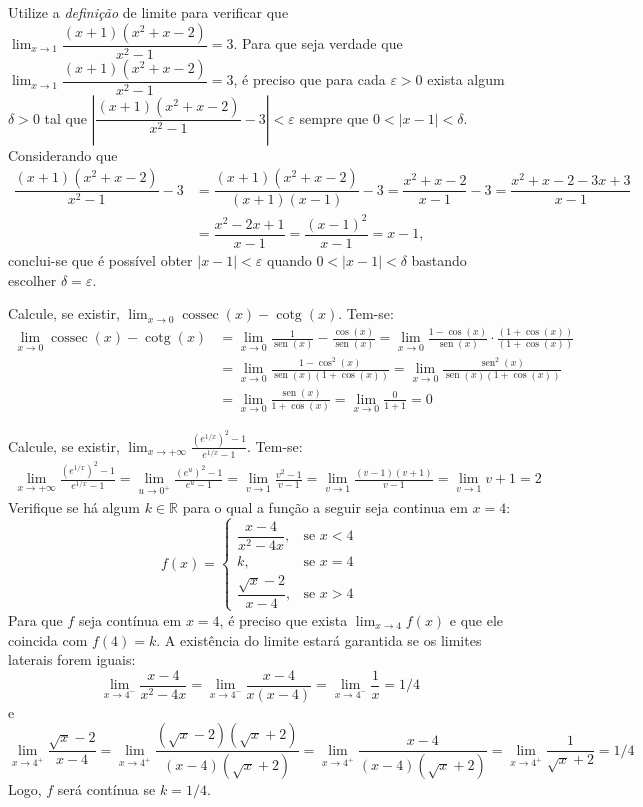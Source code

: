 \documentclass[12pt,a4paper]{article}
\newcommand*\sen{\operatorname{sen}}
\newcommand*\cotg{\operatorname{cotg}}
\newcommand*\cosec{\operatorname{cossec}}
\newcommand*\R{\mathbb{R}}
\begin{document}
\begin{ExerciseList}
\Exercise[title={2,0}] Utilize a \textit{definição} de limite para verificar que $\displaystyle \lim_{x \to 1} \dfrac{(x+1)(x^2 + x - 2)}{x^2 - 1} = 3$.
\Answer Para que seja verdade que  $\displaystyle \lim_{x \to 1} \dfrac{(x+1)(x^2 + x - 2)}{x^2 - 1} = 3$, é preciso que para cada $\varepsilon > 0$ exista algum $\delta > 0$ tal que $\left|\dfrac{(x+1)(x^2 + x - 2)}{x^2 - 1} - 3\right| < \varepsilon$ sempre que $0 < |x-1| < \delta$. Considerando que
\begin{align*}
\dfrac{(x+1)(x^2 + x - 2)}{x^2 - 1} - 3
& = \dfrac{(x+1)(x^2 + x - 2)}{(x+1)(x-1)} - 3
  = \dfrac{x^2 + x - 2}{x-1} - 3
  = \dfrac{x^2 + x - 2 - 3x + 3}{x-1} \\
& = \dfrac{x^2 -2x +1}{x-1}
  = \dfrac{(x-1)^2}{x-1}
  = x-1,
\end{align*}
conclui-se que é possível obter $|x-1| < \varepsilon$ quando $0 < |x-1| < \delta$ bastando escolher $\delta = \varepsilon$.

\Exercise[title={2,0}] Calcule, se existir, $\displaystyle\lim_{x \to 0} \cosec(x) - \cotg(x)$.
\Answer Tem-se:
\begin{align*}
\lim_{x \to 0} \cosec(x) - \cotg(x)
& = \lim_{x \to 0} \frac{1}{\sen(x)} - \frac{\cos(x)}{\sen(x)}
  = \displaystyle\lim_{x \to 0} \frac{1-\cos(x)}{\sen(x)}
    \cdot
    \frac{(1+\cos(x))}{(1+\cos(x))} \\
& = \lim_{x \to 0} \frac{1-\cos^2(x)}{\sen(x)(1+\cos(x))}
  = \lim_{x \to 0} \frac{\sen^2(x)}{\sen(x)(1+\cos(x))} \\
& = \lim_{x \to 0} \frac{\sen(x)}{1+\cos(x)}
  = \lim_{x \to 0} \frac{0}{1+1} = 0
\end{align*}

\Exercise[title={2,0}] Calcule, se existir,
$\displaystyle\lim_{x \to +\infty}
       \frac{(e^{1/x})^2-1}
            {e^{1/x}-1}$.
\Answer Tem-se:
\begin{align*}
  \lim_{x \to +\infty} \frac{(e^{1/x})^2-1}{e^{1/x}-1}
= \lim_{u \to 0^+} \frac{(e^u)^2-1}{e^u-1}
= \lim_{v \to 1} \frac{v^2-1}{v-1}
= \lim_{v \to 1} \frac{(v-1)(v+1)}{v-1}
= \lim_{v \to 1} v+1
= 2
\end{align*}
\Exercise[title={2,0}] Verifique se há algum $k\in \R$ para o qual a função a seguir seja continua em $x = 4$:
\[
f(x) =
\begin{cases}
\dfrac{x - 4}{x^2 - 4x}, & \text{se } x < 4 \\
k, & \text{se } x = 4 \\
\dfrac{\sqrt{x} - 2}{x - 4}, & \text{se } x > 4
\end{cases}
\]
\Answer Para que $f$ seja contínua em $x = 4$, é preciso que exista $\lim_{x \to 4} f(x)$ e que ele coincida com $f(4) = k$. A existência do limite estará garantida se os limites laterais forem iguais:
\[
\lim_{x \to 4^-} \dfrac{x - 4}{x^2 - 4x}
= \lim_{x \to 4^-} \dfrac{x - 4}{x(x - 4)}
= \lim_{x \to 4^-} \dfrac{1}{x}
= 1 / 4
\]
e
\[
\lim_{x \to 4^+} \dfrac{\sqrt{x} - 2}{x - 4}
= \lim_{x \to 4^+} \dfrac{(\sqrt{x} - 2)(\sqrt{x} + 2)}{(x - 4)(\sqrt{x} + 2)}
= \lim_{x \to 4^+} \dfrac{x - 4}{(x - 4)(\sqrt{x} + 2)}
= \lim_{x \to 4^+} \dfrac{1}{\sqrt{x} + 2}
= 1 / 4
\]
Logo, $f$ será contínua se $k = 1/4$.
\end{ExerciseList}
\end{document}
